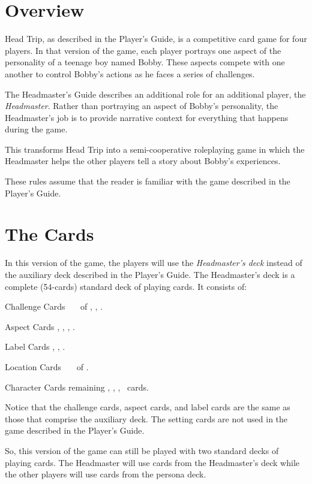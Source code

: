 \section{Overview}
Head Trip, as described in the Player's Guide, is a competitive card game for four players.
In that version of the game, each player portrays one aspect of the personality of a teenage boy named Bobby.
These aspects compete with one another to control Bobby's actions as he faces a series of challenges.

The Headmaster's Guide describes an additional role for an additional player, the \emph{Headmaster}.
Rather than portraying an aspect of Bobby's personality, the Headmaster's job is to provide narrative context for everything that happens during the game.

This transforms Head Trip into a semi-cooperative roleplaying game in which the Headmaster helps the other players tell a story about Bobby's experiences.

These rules assume that the reader is familiar with the game described in the Player's Guide.

\section{The Cards}
In this version of the game, the players will use the \emph{Headmaster's deck} instead of the auxiliary deck described in the Player's Guide.
The Headmaster's deck is a complete (54-cards) standard deck of playing cards. It consists of:

\begin{auxiliarydecklist}
	\item[Challenge Cards\hfill\normalfont{(27):}] \two\ \textendash\ \ten\ of \clubs, \hearts, \spades.
	\item[Aspect Cards\hfill\normalfont{(4):}] \jack\clubs, \queen[red]\hearts[red], \king\spades, \ace[red]\diamonds[red].
	\item[Label Cards\hfill\normalfont{(3):}] \ace\clubs, \ace[red]\hearts, \ace\spades.
	\item[Location Cards\hfill\normalfont{(9):}] \redtwo\ \textendash\ \redten\ of \diamonds.
	\item[Character Cards\hfill\normalfont{(11):}] remaining \jack, \queen, \king, \joker\ cards.
\end{auxiliarydecklist} 

Notice that the challenge cards, aspect cards, and label cards are the same as those that comprise the auxiliary deck. The setting cards are not used in the game described in the Player's Guide.

So, this version of the game can still be played with two standard decks of playing cards. The Headmaster will use cards from the Headmaster's deck while the other players will use cards from the persona deck. 
